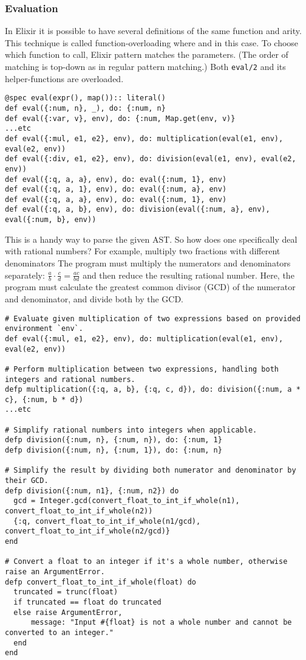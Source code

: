 \documentclass[a4paper,11pt]{article}
\begin{document}
\subsubsection*{Evaluation}
In Elixir it is possible to have several definitions of the same function and arity.
This technique is called function-overloading where and in this case.
To choose which function to call,
Elixir pattern matches the parameters.
(The order of matching is top-down as in regular pattern matching.)
Both
\texttt{eval/2} and its helper-functions
are overloaded.
\begin{verbatim}
@spec eval(expr(), map()):: literal()
def eval({:num, n}, _), do: {:num, n}
def eval({:var, v}, env), do: {:num, Map.get(env, v)}
...etc
def eval({:mul, e1, e2}, env), do: multiplication(eval(e1, env), eval(e2, env))
def eval({:div, e1, e2}, env), do: division(eval(e1, env), eval(e2, env))
def eval({:q, a, a}, env), do: eval({:num, 1}, env)
def eval({:q, a, 1}, env), do: eval({:num, a}, env)
def eval({:q, a, a}, env), do: eval({:num, 1}, env)
def eval({:q, a, b}, env), do: division(eval({:num, a}, env), eval({:num, b}, env))
\end{verbatim}
This is a handy way to parse the given AST.
So how does one specifically deal with rational numbers?
For example, multiply two fractions with different denominators
The program must multiply the numerators and denominators separately:
$\frac{a}{b} \cdot \frac{c}{d} = \frac{ac}{bd}$
and then reduce the resulting rational number.
Here, the program must calculate the greatest common divisor (GCD)
of the numerator and denominator, and divide both by the GCD.
\begin{verbatim}
# Evaluate given multiplication of two expressions based on provided environment `env`.
def eval({:mul, e1, e2}, env), do: multiplication(eval(e1, env), eval(e2, env))

# Perform multiplication between two expressions, handling both integers and rational numbers.
defp multiplication({:q, a, b}, {:q, c, d}), do: division({:num, a * c}, {:num, b * d})
...etc

# Simplify rational numbers into integers when applicable.
defp division({:num, n}, {:num, n}), do: {:num, 1}
defp division({:num, n}, {:num, 1}), do: {:num, n}

# Simplify the result by dividing both numerator and denominator by their GCD.
defp division({:num, n1}, {:num, n2}) do
  gcd = Integer.gcd(convert_float_to_int_if_whole(n1), convert_float_to_int_if_whole(n2))
  {:q, convert_float_to_int_if_whole(n1/gcd), convert_float_to_int_if_whole(n2/gcd)}
end

# Convert a float to an integer if it's a whole number, otherwise raise an ArgumentError.
defp convert_float_to_int_if_whole(float) do
  truncated = trunc(float)
  if truncated == float do truncated
  else raise ArgumentError,
      message: "Input #{float} is not a whole number and cannot be converted to an integer."
  end
end
\end{verbatim}
\end{document}
